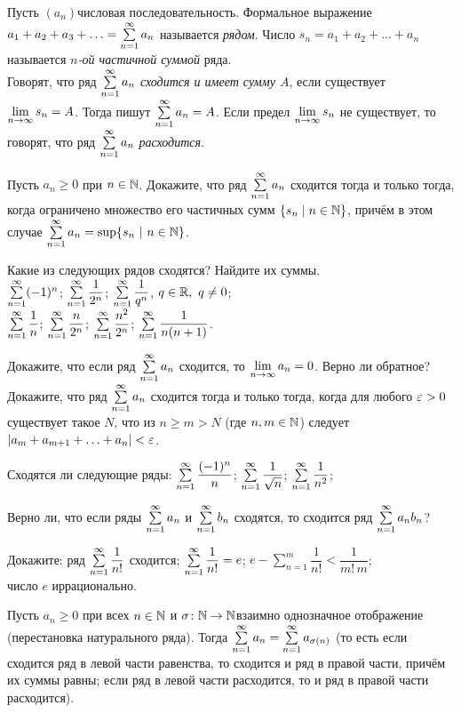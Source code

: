 \documentclass[a4paper,12pt]{article}
\begin{document}

Пусть $(a_n)$\т числовая последовательность. Формальное выражение $a_1+a_2+a_3+\ldots=\sum\limits_{n=1}^{\infty} a_n$ называется {\em рядом}. Число $s_n=a_1+a_2+\dots+a_n$ называется \emph{$n$-ой частичной суммой} ряда.\\
Говорят, что ряд $\sum\limits_{n=1}^{\infty} a_n$ \emph{сходится и имеет сумму $A$}, если существует $\lim\limits_{n \rightarrow \infty} s_n=A$. Тогда пишут $\sum\limits_{n=1}^{\infty} a_n=A$. Если предел  $\lim\limits_{n \rightarrow \infty} s_n$ не существует, то говорят, что ряд $\sum\limits_{n=1}^{\infty} a_n$ \emph{расходится}.

Пусть $a_n\geq0$ при $n\in\mathbb{N}$. Докажите, что ряд $\sum\limits_{n=1}^{\infty} a_n$ сходится тогда и только тогда, когда ограничено множество его частичных сумм $\{s_n \mid n\in\mathbb{N}\}$, причём в этом случае $\sumnui a_n=\sup\{s_n\ |\ n\in\N\}$.

Какие из следующих рядов сходятся? Найдите их суммы.\\
$\sum\limits_{n=1}^{\infty} (-1)^n$;
$\sum\limits_{n=1}^{\infty} \dfrac1{2^n}$;
$\sum\limits_{n=1}^{\infty} \dfrac1{q^n}$, $q\in\mathbb{R},\ q\ne0$;\\
$\sum\limits_{n=1}^{\infty} \dfrac1n$;
$\sum\limits_{n=1}^{\infty} \dfrac{n}{2^n}$;
$\sum\limits_{n=1}^{\infty} \dfrac{n^2}{2^n}$;
$\sum\limits_{n=1}^{\infty} \dfrac1{n(n+1)}$.

Докажите, что если ряд $\sum\limits_{n=1}^{\infty} a_n$ сходится, то $\lim\limits_{n \rightarrow \infty} a_n=0$. Верно ли обратное?\\
Докажите, что ряд $\sum\limits_{n=1}^{\infty} a_n$ сходится тогда и только тогда, когда для любого $\varepsilon>0$ существует такое $N$, что из $n \ge m > N$ (где $n,m\in\mathbb{N}$) следует $|a_m+a_{m+1}+\ldots+a_n|<\varepsilon$.



Сходятся ли следующие
ряды:
$\sum\limits_{n=1}^{\infty} \dfrac{(-1)^n}{n}$;
$\sum\limits_{n=1}^{\infty} \dfrac1{\sqrt{n}}$;
$\sum\limits_{n=1}^{\infty} \dfrac1{n^2}$;


Верно ли, что если ряды $\sum\limits_{n=1}^{\infty} a_n$ и $\sum\limits_{n=1}^{\infty} b_n$ сходятся, то сходится ряд $\sum\limits_{n=1}^{\infty} a_nb_n$?

Докажите:
ряд $\sum\limits_{n=1}^{\infty} \dfrac1{n!}$ сходится;
$\sum\limits_{n=1}^{\infty} \dfrac1{n!}=e$;
$e-\sum\limits_{n=1}^{m} \dfrac1{n!}<\dfrac1{m!\,m}$;\\
число $e$ иррационально.

Пусть $a_n \ge 0$ при всех $n\in\mathbb{N}$ и $\sigma\colon\mathbb{N}\rightarrow\mathbb{N}$\т взаимно однозначное отображение (перестановка натурального ряда). Тогда $\sum\limits_{n=1}^{\infty} a_n=
\sum\limits_{n=1}^{\infty} a_{\sigma(n)}$ (то есть если сходится ряд в левой части равенства, то сходится и ряд в правой части, причём их суммы равны; если ряд в левой части расходится, то и ряд в правой части расходится).
\end{document}
